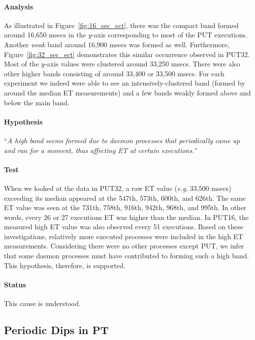 \documentclass[10pt]{article}
\begin{document}
\paragraph{Analysis} As illustrated in Figure~\ref{fig:16_sec_ect}, 
there was the compact band formed around 16,650 msecs in the $y$-axis corresponding to most of the PUT executions. 
Another {\it weak} band around 16,900 msecs was formed as well. 
Furthermore, Figure~\ref{fig:32_sec_ect} demonstrates this similar occurrence observed in PUT32. 
Most of the $y$-axis values were clustered around 33,250 msecs. 
There were also other higher bands consisting of around 33,400 or 33,500 msecs. 
For each experiment we indeed were able to see an intensively-clustered band (formed by around the median ET measurements) 
and a few bands weakly formed above and below the main band. 

\paragraph{Hypothesis} ``{\it A high band seems formed 
due to daemon processes that periodically came up and ran for a moment, thus affecting 
ET at certain executions.}''

\paragraph{Test} 
When we looked at the data in PUT32, a raw ET value ({\it e.g}, 33,500 msecs) 
exceeding its median appeared at the 547th, 573th, 600th, and 626th. 
The same ET value was seen at the 731th, 758th, 916th, 942th, 968th, and 
995th. 
In other words, every 26 or 27 executions ET was higher than the median.
In PUT16, the measured high ET value was also observed every 51 executions. 
Based on these investigations, 
relatively more executed processes were included in the high ET measurements. 
Considering there were no other processes except PUT, 
we infer that some daemon processes must have contributed to forming such a high band. 
This hypothesis, therefore, is supported. 

\paragraph{Status} This cause is understood. 

\clearpage
\newpage

\subsection{Periodic Dips in PT}\label{sec:pd_pt}
\end{document}
